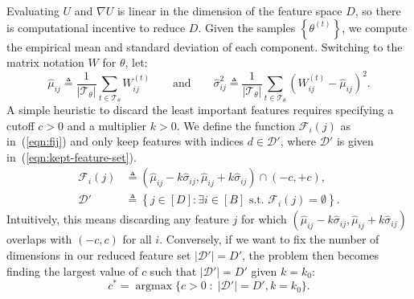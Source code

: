 Evaluating $U$ and $\nabla U$ is linear in 
the dimension of the feature space $D$,
so there is computational incentive to reduce $D$.
Given the samples $\left\{ \theta^{(t)} \right\}$, we compute the empirical mean and standard deviation of each component. 
Switching to the matrix notation $W$ for $\theta$,
let:
%
\begin{equation}
	\hat{\mu}_{ij} \triangleq \frac{1}{|\mathcal{T}_\theta|} \sum_{t \in \mathcal{T}_\theta} W_{ij}^{(t)} \qquad \textrm{and} \qquad
	\hat{\sigma}_{ij}^2 \triangleq \frac{1}{|\mathcal{T}_\theta|} \sum_{t \in \mathcal{T}_\theta} \left( W_{ij}^{(t)} - \hat{\mu}_{ij} \right)^2.
\end{equation}
%
A simple heuristic to discard the least important features requires specifying a cutoff $c > 0$ and a multiplier $k > 0$. We define the function $\mathcal{F}_i(j)$ 
as in~(\ref{eqn:fij}) and only keep features with indices $d \in \mathcal{D}'$, where $\mathcal{D}'$ is given in~(\ref{eqn:kept-feature-set}).
%
\begin{align}
	\mathcal{F}_i(j) &\triangleq (\hat{\mu}_{ij} - k \hat{\sigma}_{ij}, \hat{\mu}_{ij} + k \hat{\sigma}_{ij}) \cap (-c, +c),
	\label{eqn:fij} \\
	\mathcal{D}' &\triangleq \left\{ j \in [D] : \exists i \in [B] \textrm{ s.t. }  \mathcal{F}_i(j) = \emptyset \right\}.
	\label{eqn:kept-feature-set}
\end{align}
%
Intuitively, this means discarding any feature $j$ for which 
$(\hat{\mu}_{ij} - k\hat{\sigma}_{ij}, \hat{\mu}_{ij} + k \hat{\sigma}_{ij})$ overlaps with
$(-c, c)$ for all $i$. 
Conversely, if we want to fix the number of dimensions in our reduced feature set $|\mathcal{D}'|=D'$, the problem then becomes finding the largest value of $c$ such that $|\mathcal{D}'|=D'$ given $k=k_0$:
%
\begin{equation}
	c^* = {\operatorname{argmax}} \{c>0\; : \;|\mathcal{D}'| = D', k=k_0\}.
	\label{eqn:c-star}
\end{equation}

